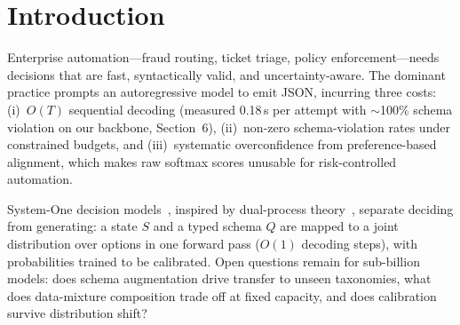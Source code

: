 \section{Introduction}
Enterprise automation---fraud routing, ticket triage, policy enforcement---needs
decisions that are fast, syntactically valid, and uncertainty-aware. The dominant
practice prompts an autoregressive model to emit JSON, incurring three costs:
(i)~$O(T)$ sequential decoding (measured 0.18\,s per attempt with
$\sim$100\% schema violation on our backbone, Section~6),
(ii)~non-zero schema-violation rates under constrained budgets, and
(iii)~systematic overconfidence from preference-based alignment, which makes raw
softmax scores unusable for risk-controlled automation.

System-One decision models~\cite{typesafe-jev,cloudflare-clef,convai-laya},
inspired by dual-process theory~\cite{kahneman2011}, separate deciding from
generating: a state $S$ and a typed schema $Q$ are mapped to a joint
distribution over options in one forward pass ($O(1)$ decoding steps), with
probabilities trained to be calibrated. Open questions remain for sub-billion
models: does schema augmentation drive transfer to unseen taxonomies, what does
data-mixture composition trade off at fixed capacity, and does calibration
survive distribution shift?

